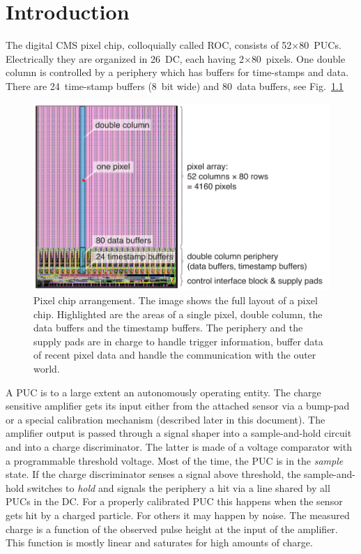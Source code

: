 \chapter{Introduction}

The digital CMS pixel chip, colloquially called \gls{ROC}, consists of 52$\times$80~\glspl{PUC}. Electrically they are organized in 26~\gls{DC}, each having 2$\times$80~pixels. One double column is controlled by a periphery which has buffers for time-stamps and data. There are 24~time-stamp buffers (8~bit wide) and 80~data buffers, see Fig.~\ref{fig:ROCimage}

\begin{figure}[hbtp]
	\begin{center}
	\includegraphics[width=.9\textwidth]{img/ROCimage.pdf}
	\end{center}
	\caption{Pixel chip arrangement. The image shows the full layout of a pixel chip. Highlighted are the areas of a single pixel, double column, the data buffers and the timestamp buffers. The periphery and the supply pads are in charge to handle trigger information, buffer data of recent pixel data and handle the communication with the outer world.}
	\label{fig:ROCimage}
\end{figure}

A \gls{PUC} is to a large extent an autonomously operating entity. The charge sensitive amplifier gets its input either from the attached sensor via a bump-pad or a special calibration mechanism (described later in this document). The amplifier output is passed through a signal shaper into a sample-and-hold circuit and into a charge discriminator. The latter is made of a voltage comparator with a programmable threshold voltage. Most of the time, the \gls{PUC} is in the \emph{sample} state. If the charge discriminator senses a signal above threshold, the sample-and-hold switches to \emph{hold} and signals the periphery a hit via a line shared by all \glspl{PUC} in the \gls{DC}. For a properly calibrated \gls{PUC} this happens when the sensor gets hit by a charged particle. For others it may happen by noise. The measured charge is a function of the observed pulse height at the input of the amplifier. This function is mostly linear and saturates for high amounts of charge.

